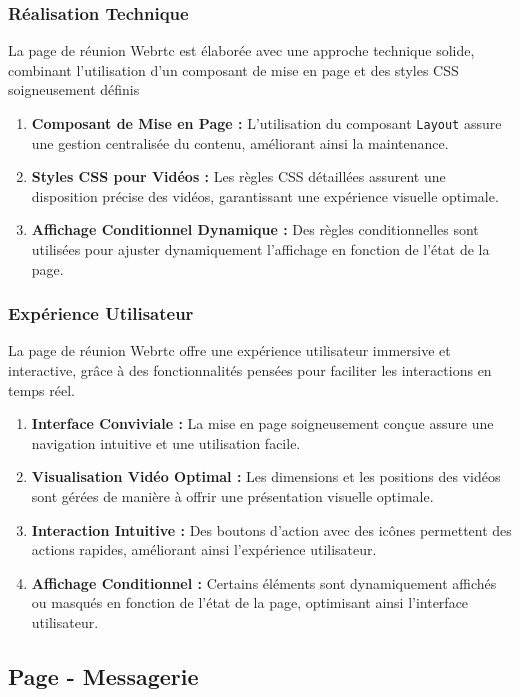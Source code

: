 \documentclass[12pt, a4paper, oneside]{thesis}
\begin{document}
\subsubsection{Réalisation Technique}
La page de réunion Webrtc est élaborée avec une approche technique solide, combinant l'utilisation d'un composant de mise en page et des styles CSS soigneusement définis

\begin{enumerate}
    \item \textbf{Composant de Mise en Page :} L'utilisation du composant \texttt{Layout} assure une gestion centralisée du contenu, améliorant ainsi la maintenance.
    \item \textbf{Styles CSS pour Vidéos :} Les règles CSS détaillées assurent une disposition précise des vidéos, garantissant une expérience visuelle optimale.
    \item \textbf{Affichage Conditionnel Dynamique :} Des règles conditionnelles sont utilisées pour ajuster dynamiquement l'affichage en fonction de l'état de la page.
\end{enumerate}

\subsubsection{Expérience Utilisateur}
La page de réunion Webrtc offre une expérience utilisateur immersive et interactive, grâce à des fonctionnalités pensées pour faciliter les interactions en temps réel.

\begin{enumerate}
    \item \textbf{Interface Conviviale :} La mise en page soigneusement conçue assure une navigation intuitive et une utilisation facile.
    \item \textbf{Visualisation Vidéo Optimal :} Les dimensions et les positions des vidéos sont gérées de manière à offrir une présentation visuelle optimale.
    \item \textbf{Interaction Intuitive :} Des boutons d'action avec des icônes permettent des actions rapides, améliorant ainsi l'expérience utilisateur.
    \item \textbf{Affichage Conditionnel :} Certains éléments sont dynamiquement affichés ou masqués en fonction de l'état de la page, optimisant ainsi l'interface utilisateur.
\end{enumerate}


\newpage
\subsection{Page - Messagerie}
\end{document}
